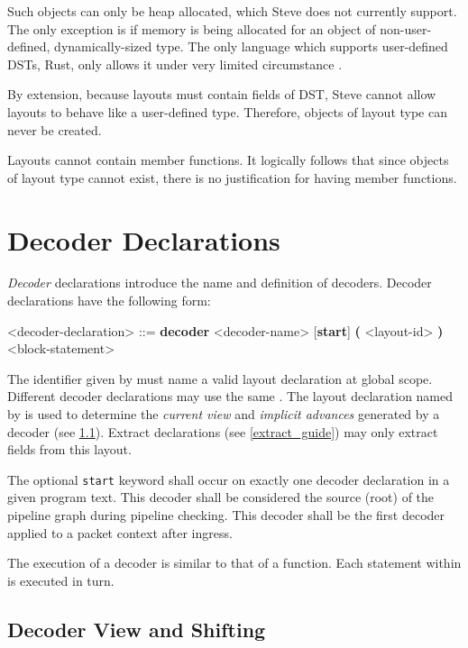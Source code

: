 Such objects can only be heap allocated, which Steve does not currently support. The only exception is if memory is being allocated for an object of non-user-defined, dynamically-sized type. The only language which supports user-defined DSTs, Rust, only allows it under very limited circumstance \cite{rust_dst_std}.

By extension, because layouts must contain fields of DST, Steve cannot allow layouts to behave like a user-defined type. Therefore, objects of layout type can never be created.
  
Layouts cannot contain member functions. It logically follows that since objects of layout type cannot exist, there is no justification for having member functions.

\section{Decoder Declarations} \label{decoder_guide}

\textit{Decoder} declarations introduce the name and definition of decoders. Decoder declarations have the following form:

\begin{minip}
\begin{grammar}
\singlespace
<decoder-declaration> ::=
\textbf{decoder} <decoder-name> [\textbf{start}] 
\textbf{(} <layout-id> \textbf{)}
<block-statement>
\end{grammar}
\end{minip}

The identifier given by  must name a valid layout declaration at global scope. Different decoder declarations may use the same . The layout declaration named by  is used to determine the \textit{current view} and \textit{implicit advances} generated by a decoder (see \ref{decoder_view}). Extract declarations (see \ref{extract_guide}) may only extract fields from this layout.

The optional \texttt{start} keyword shall occur on exactly one decoder declaration in a given program text. This decoder shall be considered the source (root) of the pipeline graph during pipeline checking. This decoder shall be the first decoder applied to a packet context after ingress.

The execution of a decoder is similar to that of a function. Each statement within  is executed in turn. 

\subsection{Decoder View and Shifting} \label{decoder_view}

